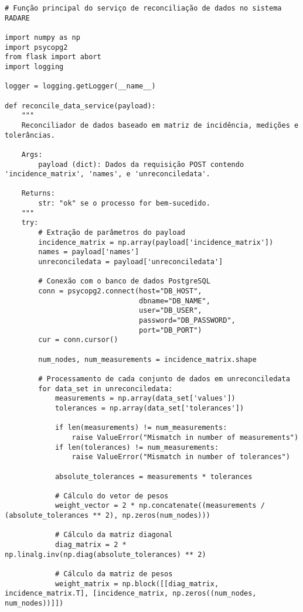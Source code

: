 \begin{verbatim}
# Função principal do serviço de reconciliação de dados no sistema RADARE

import numpy as np
import psycopg2
from flask import abort
import logging

logger = logging.getLogger(__name__)

def reconcile_data_service(payload):
    """
    Reconciliador de dados baseado em matriz de incidência, medições e tolerâncias.

    Args:
        payload (dict): Dados da requisição POST contendo 'incidence_matrix', 'names', e 'unreconciledata'.

    Returns:
        str: "ok" se o processo for bem-sucedido.
    """
    try:
        # Extração de parâmetros do payload
        incidence_matrix = np.array(payload['incidence_matrix'])
        names = payload['names']
        unreconciledata = payload['unreconciledata']

        # Conexão com o banco de dados PostgreSQL
        conn = psycopg2.connect(host="DB_HOST", 
                                dbname="DB_NAME", 
                                user="DB_USER", 
                                password="DB_PASSWORD",
                                port="DB_PORT")
        cur = conn.cursor()

        num_nodes, num_measurements = incidence_matrix.shape

        # Processamento de cada conjunto de dados em unreconciledata
        for data_set in unreconciledata:
            measurements = np.array(data_set['values'])
            tolerances = np.array(data_set['tolerances'])

            if len(measurements) != num_measurements:
                raise ValueError("Mismatch in number of measurements")
            if len(tolerances) != num_measurements:
                raise ValueError("Mismatch in number of tolerances")

            absolute_tolerances = measurements * tolerances

            # Cálculo do vetor de pesos
            weight_vector = 2 * np.concatenate((measurements / (absolute_tolerances ** 2), np.zeros(num_nodes)))

            # Cálculo da matriz diagonal
            diag_matrix = 2 * np.linalg.inv(np.diag(absolute_tolerances) ** 2)

            # Cálculo da matriz de pesos
            weight_matrix = np.block([[diag_matrix, incidence_matrix.T], [incidence_matrix, np.zeros((num_nodes, num_nodes))]])


\end{verbatim}
